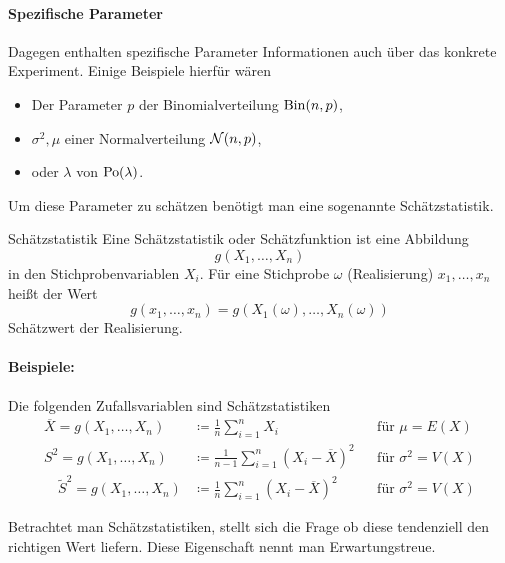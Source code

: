 \paragraph{Spezifische Parameter}
Dagegen enthalten spezifische Parameter Informationen auch über das konkrete Experiment. Einige Beispiele hierfür wären
\begin{itemize}
	\item Der Parameter $p$ der Binomialverteilung $\operatorname{Bin}(n,p)$,
	\item $\sigma^2,\mu$ einer Normalverteilung $\mathcal{N}(n,p)$,
	\item oder $\lambda$ von $\operatorname{Po}(\lambda)$.
\end{itemize}
Um diese Parameter zu schätzen benötigt man eine sogenannte Schätzstatistik. 

\begin{definition}{Schätzstatistik}
	Eine Schätzstatistik oder Schätzfunktion ist eine Abbildung
	\begin{equation*}
		g(X_1,\ldots,X_n)
	\end{equation*}
	in den Stichprobenvariablen $X_i$.
	Für eine Stichprobe $\omega$ (Realisierung) $x_1,\ldots,x_n$ heißt der Wert
	\begin{equation*}
		g(x_1,\ldots,x_n)=g(X_1(\omega),\ldots,X_n(\omega))
	\end{equation*}
	Schätzwert der Realisierung.
\end{definition}
\paragraph{Beispiele:}
Die folgenden Zufallsvariablen sind Schätzstatistiken
\begin{equation}\label{eq:schatzstatistiken}
	\begin{split}
		\overline X=g(X_1,\ldots,X_n)&\coloneqq \frac1n\sum_{i=1}^n X_i&&\text{für }\mu=E(X)\\
		S^2 =g(X_1,\ldots,X_n)&\coloneqq \frac{1}{n-1}\sum_{i=1}^n (X_i-\overline X)^2&&\text{für }\sigma^2=V(X)\\
		\quad \tilde S^2 =g(X_1,\ldots,X_n)&\coloneqq\frac1n\sum_{i=1}^n (X_i-\overline X)^2&&\text{für }\sigma^2=V(X)
	\end{split}
\end{equation}


Betrachtet man Schätzstatistiken, stellt sich die Frage ob diese tendenziell den richtigen Wert liefern. Diese Eigenschaft nennt man Erwartungstreue.

